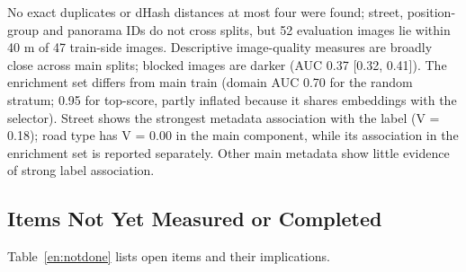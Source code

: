No exact duplicates or dHash distances at most four were found; street, position-group and panorama IDs do not cross splits, but 52 evaluation images lie within 40 m of 47 train-side images. Descriptive image-quality measures are broadly close across main splits; blocked images are darker (AUC 0.37 [0.32, 0.41]). The enrichment set differs from main train (domain AUC 0.70 for the random stratum; 0.95 for top-score, partly inflated because it shares embeddings with the selector). Street shows the strongest metadata association with the label (V = 0.18); road type has V = 0.00 in the main component, while its association in the enrichment set is reported separately. Other main metadata show little evidence of strong label association.

\subsection{Items Not Yet Measured or Completed}
Table~\ref{en:notdone} lists open items and their implications.
